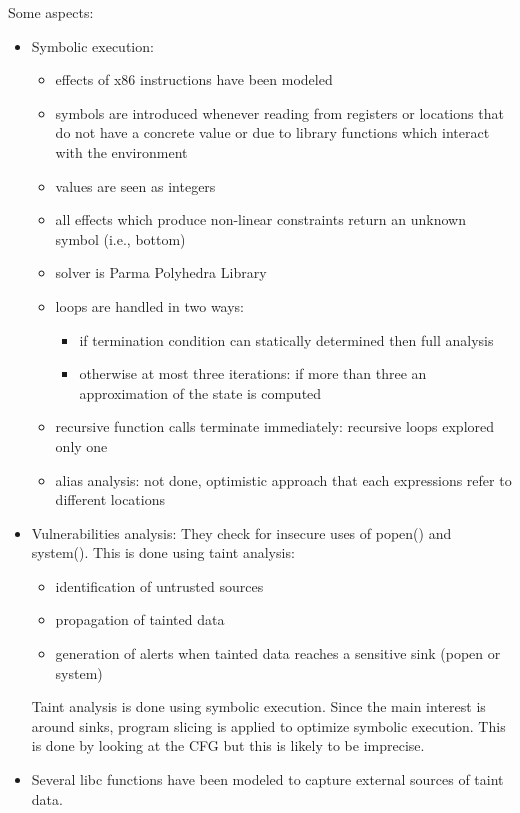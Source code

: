 Some aspects:
\begin{itemize}
  \item Symbolic execution:
    \begin{itemize}
      \item effects of x86 instructions have been modeled
      \item symbols are introduced whenever reading from registers or locations that do not have a concrete value or due to library functions which interact with the environment
      \item values are seen as integers
      \item all effects which produce non-linear constraints return an unknown symbol (i.e., bottom)
      \item solver is Parma Polyhedra Library
      \item loops are handled in two ways:
        \begin{itemize}
          \item if termination condition can statically determined then full analysis
          \item otherwise at most three iterations: if more than three an approximation of the state is computed
        \end{itemize}
      \item recursive function calls terminate immediately: recursive loops explored only one
      \item alias analysis: not done, optimistic approach that each expressions refer to different locations
    \end{itemize}
  \item Vulnerabilities analysis: They check for insecure uses of popen() and system(). This is done using taint analysis:
    \begin{itemize}
      \item identification of untrusted sources
      \item propagation of tainted data
      \item generation of alerts when tainted data reaches a sensitive sink (popen or system)
    \end{itemize}
    Taint analysis is done using symbolic execution. Since the main interest is around sinks, program slicing is applied to optimize symbolic execution. This is done by looking at the CFG but this is likely to be imprecise.
  \item Several libc functions have been modeled to capture external sources of taint data.
\end{itemize} 

